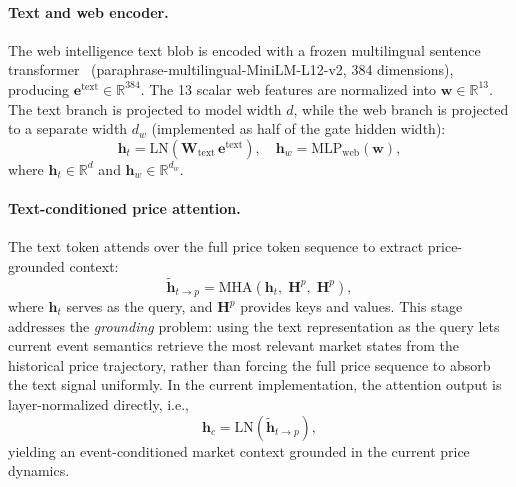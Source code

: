 \paragraph{Text and web encoder.}
The web intelligence text blob is encoded with a frozen multilingual sentence transformer~\cite{reimers2019sentencebert} (paraphrase-multilingual-MiniLM-L12-v2, 384 dimensions), producing $\mathbf{e}^{\mathrm{text}} \in \mathbb{R}^{384}$.
The 13 scalar web features are normalized into $\mathbf{w} \in \mathbb{R}^{13}$.
The text branch is projected to model width $d$, while the web branch is projected to a separate width $d_w$ (implemented as half of the gate hidden width):
\[
\mathbf{h}_{t} = \mathrm{LN}(\mathbf{W}_{\mathrm{text}}\,\mathbf{e}^{\mathrm{text}}),\quad
\mathbf{h}_{w} = \mathrm{MLP}_{\mathrm{web}}(\mathbf{w}),
\]
where $\mathbf{h}_{t} \in \mathbb{R}^{d}$ and $\mathbf{h}_{w} \in \mathbb{R}^{d_w}$.

\paragraph{Text-conditioned price attention.}
The text token attends over the full price token sequence to extract price-grounded context:
\begin{equation}
\tilde{\mathbf{h}}_{t \to p} = \mathrm{MHA}(\mathbf{h}_{t},\; \mathbf{H}^p,\; \mathbf{H}^p),
\label{eq:text2price}
\end{equation}
where $\mathbf{h}_{t}$ serves as the query, and $\mathbf{H}^p$ provides keys and values.
This stage addresses the \emph{grounding} problem: using the text representation as the query lets current event semantics retrieve the most relevant market states from the historical price trajectory, rather than forcing the full price sequence to absorb the text signal uniformly.
In the current implementation, the attention output is layer-normalized directly, i.e.,
\[
\mathbf{h}_c = \mathrm{LN}(\tilde{\mathbf{h}}_{t \to p}),
\]
yielding an event-conditioned market context grounded in the current price dynamics.

